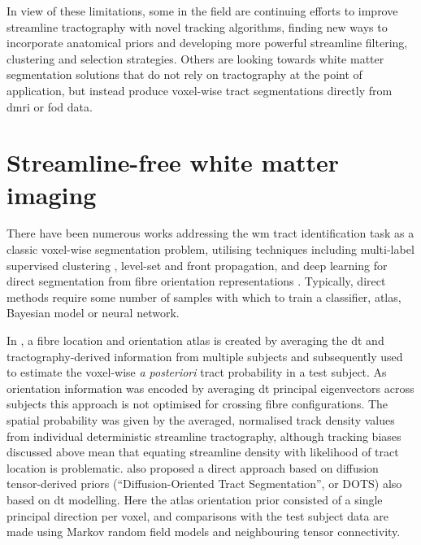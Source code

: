 In view of these limitations, some in the field are continuing efforts to improve streamline tractography with novel tracking algorithms, finding new ways to incorporate anatomical priors and developing more powerful streamline filtering, clustering and selection strategies.
Others are looking towards white matter segmentation solutions that do not rely on tractography at the point of application, but instead produce voxel-wise tract segmentations directly from \gls{dmri} or \gls{fod} data.

\section{Streamline-free white matter imaging}

There have been numerous works addressing the \gls{wm} tract identification task as a classic voxel-wise segmentation problem, utilising techniques including multi-label supervised clustering \autocite{Ratnarajah2014}, level-set and front propagation\textcite{Nazem-Zadeh2011, Hao2014}, and deep learning for direct segmentation from fibre orientation representations \autocite{Wasserthal2018,Li2020}.
Typically, direct methods require some number of samples with which to train a classifier, atlas, Bayesian model or neural network.

In \textcite{Hagler2009}, a fibre location and orientation atlas is created by averaging the \gls{dt} and tractography-derived information from multiple subjects and subsequently used to estimate the voxel-wise \textit{a posteriori} tract probability in a test subject.
As orientation information was encoded by averaging \gls{dt} principal eigenvectors across subjects this approach is not optimised for crossing fibre configurations.
The spatial probability was given by the averaged, normalised track density values from individual deterministic streamline tractography, although tracking biases discussed above mean that equating streamline density with likelihood of tract location is problematic\autocite{Rheault2019,Smith2013}.
\textcite{Bazin2011} also proposed a direct approach based on diffusion tensor-derived priors (``Diffusion-Oriented Tract Segmentation'', or DOTS) also based on \gls{dt} modelling.
Here the atlas orientation prior consisted of a single principal direction per voxel, and comparisons with the test subject data are made using Markov random field models and neighbouring tensor connectivity.

